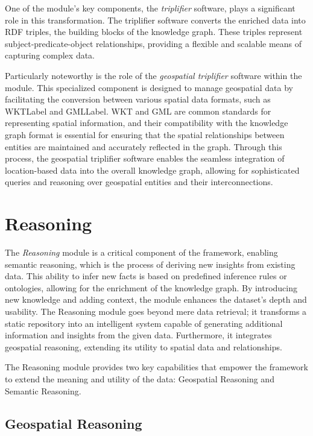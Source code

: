 One of the module's key components, the \textit{triplifier} software, plays a significant role in this transformation. The triplifier software converts the enriched data into RDF triples, the building blocks of the knowledge graph. These triples represent subject-predicate-object relationships, providing a flexible and scalable means of capturing complex data. 

Particularly noteworthy is the role of the \textit{geospatial triplifier} software within the module. This specialized component is designed to manage geospatial data by facilitating the conversion between various spatial data formats, such as \acrfull{WKTLabel}\cite{WellknownTextRepresentationa} and \acrfull{GMLLabel}\cite{GeographyMarkupLanguagea}. WKT and GML are common standards for representing spatial information, and their compatibility with the knowledge graph format is essential for ensuring that the spatial relationships between entities are maintained and accurately reflected in the graph. Through this process, the geospatial triplifier software enables the seamless integration of location-based data into the overall knowledge graph, allowing for sophisticated queries and reasoning over geospatial entities and their interconnections.

\section{Reasoning}\label{VI-sec:reasoning}

The \textit{Reasoning} module is a critical component of the framework, enabling semantic reasoning, which is the process of deriving new insights from existing data. This ability to infer new facts is based on predefined inference rules or ontologies, allowing for the enrichment of the knowledge graph. By introducing new knowledge and adding context, the module enhances the dataset’s depth and usability. The Reasoning module goes beyond mere data retrieval; it transforms a static repository into an intelligent system capable of generating additional information and insights from the given data. Furthermore, it integrates geospatial reasoning, extending its utility to spatial data and relationships.


The Reasoning module provides two key capabilities that empower the framework to extend the meaning and utility of the data: Geospatial Reasoning and Semantic Reasoning.

\subsection{Geospatial Reasoning}\label{VI-subsec:geospatialReasoning}

